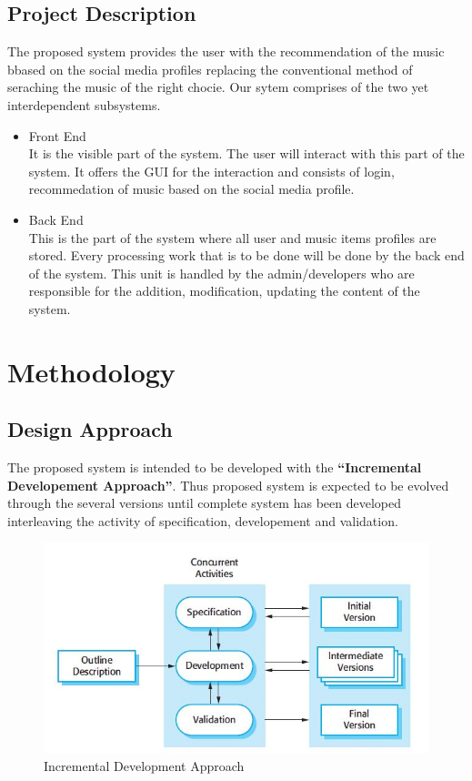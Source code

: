 \documentclass[a4paper,12pt]{article}
\begin{document}
\subsection{Project Description}
The proposed system provides the user with the recommendation of the music bbased on the social media profiles replacing the conventional method of seraching the music of the right chocie.
Our sytem comprises of the two yet interdependent subsystems.
\begin{itemize}
	\item Front End \\
		It is the visible part of the system. The user will interact with this part of the system. It offers the GUI for the interaction and consists of login, recommedation of music based on the social media profile.
	\item Back End \\
		This is the part of the system where all user and music items profiles are stored. Every processing work that is to be done will be done by the back end of the system. This unit is handled by the admin/developers who are responsible for the addition, modification, updating the content of the system.
\end{itemize}
\cleardoublepage

\section{Methodology}

\subsection{Design Approach}
The proposed system is intended to be developed with the \textbf{``Incremental Developement Approach''}. Thus proposed system is expected to be evolved through the several versions until complete system has been developed interleaving the activity of specification, developement and validation.
\begin{figure}[ht!]
  \centering
  \includegraphics[width=450px]{figs/incremental.jpg}
  \caption{Incremental Development Approach \label{fig:incremental}}
\end{figure}
\end{document}
